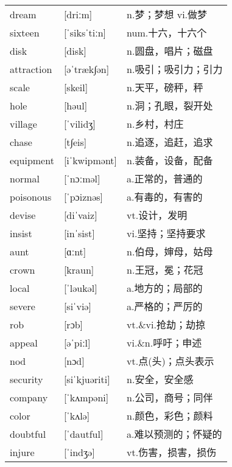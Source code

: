 \documentclass[a4paper]{article}
\begin{document}
\section{}
\begin{tabular}{l l l}

dream & [driːm] & n.梦；梦想 vi.做梦 \\
sixteen & [ˈsiksˈtiːn] & num.十六，十六个 \\
disk & [disk] & n.圆盘，唱片；磁盘 \\
attraction & [əˈtræk∫ən] & n.吸引；吸引力；引力 \\
scale & [skeil] & n.天平，磅秤，秤 \\
hole & [həul] & n.洞；孔眼，裂开处 \\
village & [ˈvilidʒ] & n.乡村，村庄 \\
chase & [t∫eis] & n.追逐，追赶，追求 \\
equipment & [iˈkwipmənt] & n.装备，设备，配备 \\
normal & [ˈnɔːməl] & a.正常的，普通的 \\
poisonous & [ˈpɔiznəs] & a.有毒的，有害的 \\
devise & [diˈvaiz] & vt.设计，发明 \\
insist & [inˈsist] & vi.坚持；坚持要求 \\
aunt & [ɑːnt] & n.伯母，婶母，姑母 \\
crown & [kraun] & n.王冠，冕；花冠 \\
local & [ˈləukəl] & a.地方的；局部的 \\
severe & [siˈviə] & a.严格的；严厉的 \\
rob & [rɔb] & vt.\&vi.抢劫；劫掠 \\
appeal & [əˈpiːl] & vi.\&n.呼吁；申述 \\
nod & [nɔd] & vt.点(头)；点头表示 \\
security & [siˈkjuəriti] & n.安全，安全感 \\
company & [ˈkʌmpəni] & n.公司，商号；同伴 \\
color & [ˈkʌlə] & n.颜色，彩色；颜料 \\
doubtful & [ˈdautful] & a.难以预测的；怀疑的 \\
injure & [ˈindʒə] & vt.伤害，损害，损伤 \\

\end{tabular}
\end{document}
